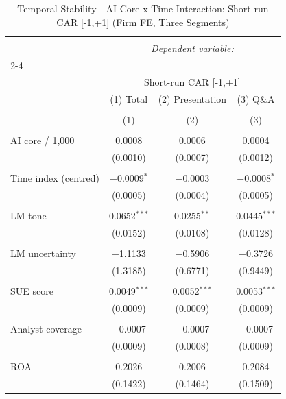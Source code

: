 
\begin{table}[!htbp] \centering 
  \caption{Temporal Stability - AI-Core x Time Interaction: Short-run CAR [-1,+1] (Firm FE, Three Segments)} 
  \label{} 
\begin{tabular}{@{\extracolsep{5pt}}lccc} 
\\[-1.8ex]\hline 
\hline \\[-1.8ex] 
 & \multicolumn{3}{c}{\textit{Dependent variable:}} \\ 
\cline{2-4} 
\\[-1.8ex] & \multicolumn{3}{c}{Short-run CAR [-1,+1]} \\ 
 & (1) Total & (2) Presentation & (3) Q\&A \\ 
\\[-1.8ex] & (1) & (2) & (3)\\ 
\hline \\[-1.8ex] 
 AI core / 1,000 & 0.0008 & 0.0006 & 0.0004 \\ 
  & (0.0010) & (0.0007) & (0.0012) \\ 
  & & & \\ 
 Time index (centred) & $-$0.0009$^{*}$ & $-$0.0003 & $-$0.0008$^{*}$ \\ 
  & (0.0005) & (0.0004) & (0.0005) \\ 
  & & & \\ 
 LM tone & 0.0652$^{***}$ & 0.0255$^{**}$ & 0.0445$^{***}$ \\ 
  & (0.0152) & (0.0108) & (0.0128) \\ 
  & & & \\ 
 LM uncertainty & $-$1.1133 & $-$0.5906 & $-$0.3726 \\ 
  & (1.3185) & (0.6771) & (0.9449) \\ 
  & & & \\ 
 SUE score & 0.0049$^{***}$ & 0.0052$^{***}$ & 0.0053$^{***}$ \\ 
  & (0.0009) & (0.0009) & (0.0009) \\ 
  & & & \\ 
 Analyst coverage & $-$0.0007 & $-$0.0007 & $-$0.0007 \\ 
  & (0.0009) & (0.0008) & (0.0009) \\ 
  & & & \\ 
 ROA & 0.2026 & 0.2006 & 0.2084 \\ 
  & (0.1422) & (0.1464) & (0.1509) \\ 

\end{tabular}
\end{table}
